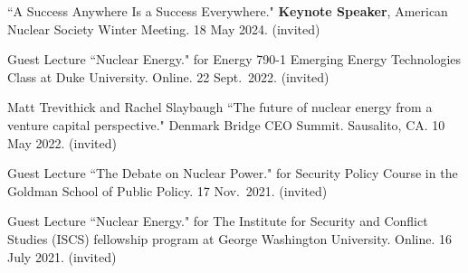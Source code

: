 \begin{bibsection}
\item ``A Success Anywhere Is a Success Everywhere." \textbf{Keynote Speaker}, American Nuclear Society Winter Meeting. 18 May 2024. (invited)

\item Guest Lecture ``Nuclear Energy." for Energy 790-1 Emerging Energy Technologies Class at Duke University. Online. 22 Sept.\ 2022. (invited)


\item Matt Trevithick and Rachel Slaybaugh ``The future of nuclear energy from a venture capital perspective." Denmark Bridge CEO Summit. Sausalito, CA. 10 May 2022. (invited)

\item Guest Lecture ``The Debate on Nuclear Power." for Security Policy Course in the Goldman School of Public Policy. 17 Nov.\ 2021. (invited)






\item Guest Lecture ``Nuclear Energy." for The Institute for Security and Conflict Studies (ISCS) fellowship program at George Washington University. Online. 16 July 2021. (invited)



\end{bibsection}
